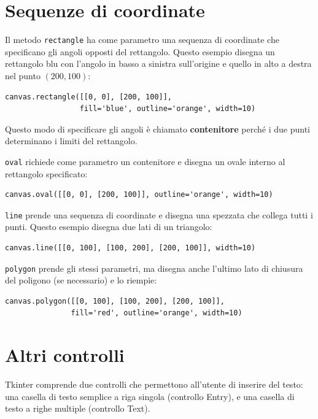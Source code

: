 \documentclass[10pt]{book}
\begin{document}
\section{Sequenze di coordinate}

Il metodo {\tt rectangle} ha come parametro una sequenza di coordinate che specificano gli angoli opposti del rettangolo. Questo esempio disegna un rettangolo blu con l'angolo in basso a sinistra sull'origine e quello in alto a destra nel punto $(200,100)$:

\begin{verbatim}
canvas.rectangle([[0, 0], [200, 100]], 
                 fill='blue', outline='orange', width=10)
\end{verbatim}
%
Questo modo di specificare gli angoli è chiamato {\bf contenitore} perché i due punti determinano i limiti del rettangolo.

{\tt oval} richiede come parametro un contenitore e disegna un ovale interno al rettangolo specificato:

\begin{verbatim}
canvas.oval([[0, 0], [200, 100]], outline='orange', width=10)
\end{verbatim}
%
{\tt line} prende una sequenza di coordinate e disegna una spezzata che collega tutti i punti. Questo esempio disegna due lati di un triangolo:

\begin{verbatim}
canvas.line([[0, 100], [100, 200], [200, 100]], width=10)
\end{verbatim}
%
{\tt polygon} prende gli stessi parametri, ma disegna anche l'ultimo lato di chiusura del poligono (se necessario) e lo riempie:

\begin{verbatim}
canvas.polygon([[0, 100], [100, 200], [200, 100]],
               fill='red', outline='orange', width=10)
\end{verbatim}
%


\section{Altri controlli}

Tkinter comprende due controlli che permettono all'utente di inserire del testo: una casella di testo semplice a riga singola (controllo Entry), e una casella di testo a righe multiple (controllo Text).
\end{document}
